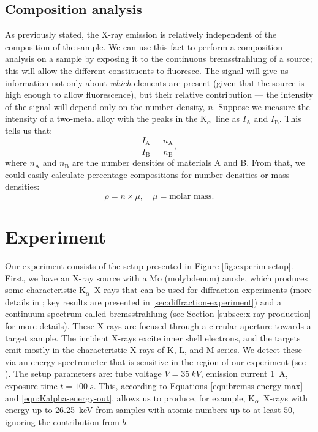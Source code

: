\documentclass[11pt,a4paper,twoside,onecolumn]{article}
\newcommand{\Kalpha}{$\mathrm{K}_\alpha$~}
\begin{document}
\subsection{Composition analysis}\label{subsec:compos-analysis}
As previously stated, the X-ray emission is relatively independent of the composition of the sample. We can use this fact to perform a composition analysis on a sample by exposing it to the continuous bremsstrahlung of a source; this will allow the different constituents to fluoresce. The signal will give us information not only about \emph{which} elements are present (given that the source is high enough to allow fluorescence), but their relative contribution --- the intensity of the signal will depend only on the number density, $n$. Suppose we measure the intensity of a two-metal alloy with the peaks in the \Kalpha line as $I_\mathrm{A}$ and $I_\mathrm{B}$.
This tells us that:
\begin{equation}\label{eqn:intensities-densities}
    \frac{I_\mathrm{A}}{I_\mathrm{B}} = \frac{n_\mathrm{A}}{n_\mathrm{B}},
\end{equation}
where $n_\mathrm{A}$ and $n_\mathrm{B}$ are the number densities of materials A and B. From that, we could easily calculate percentage compositions for number densities or mass densities:
\begin{equation}
    \rho = n \times \mu, \quad \mu = \text{molar mass}.
\end{equation}

\section{Experiment}\label{sec:experiment}
Our experiment consists of the setup presented in Figure \ref{fig:experim-setup}. First, we have an X-ray source with a Mo (molybdenum) anode, which produces some characteristic \Kalpha X-rays that can be used for diffraction experiments (more details in \cite{OxfPhys2010}; key results are presented in \ref{sec:diffraction-experiment}) and a continuum spectrum called bremsstrahlung (see Section \ref{subsec:x-ray-production} for more details). These X-rays are focused through a circular aperture towards a target sample. The incident X-rays excite inner shell electrons, and the targets emit mostly in the characteristic X-rays of K, L, and M series. We detect these via an energy spectrometer that is sensitive in the region of our experiment (see \cite{xRayManual}). The setup parameters are: tube voltage $V = \qty{35}{kV}$, emission current \qty{1}{A}, exposure time $t=\qty{100}{s}$. This, according to Equations \eqref{eqn:bremss-energy-max} and \eqref{eqn:Kalpha-energy-out}, allows us to produce, for example, \Kalpha X-rays with energy up to \qty{26.25}{keV} from samples with atomic numbers up to at least $50$, ignoring the contribution from $b$.
\end{document}
